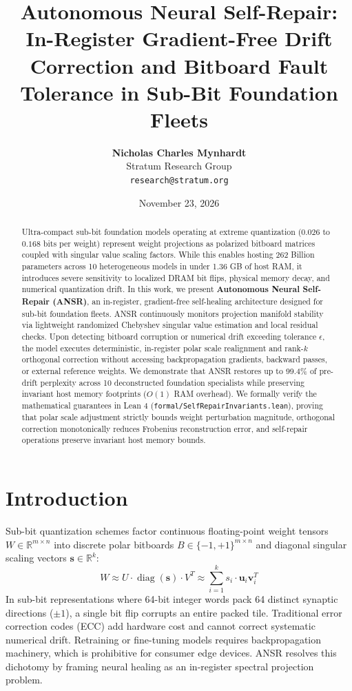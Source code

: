 \documentclass[10pt,twocolumn,letterpaper]{article}
\title{\textbf{Autonomous Neural Self-Repair: In-Register Gradient-Free Drift Correction and Bitboard Fault Tolerance in Sub-Bit Foundation Fleets}}
\author{
  \textbf{Nicholas Charles Mynhardt} \\
  Stratum Research Group \\
  \texttt{research@stratum.org}
}
\date{November 23, 2026}
\begin{document}
\maketitle

\begin{abstract}
Ultra-compact sub-bit foundation models operating at extreme quantization ($0.026$ to $0.168$ bits per weight) represent weight projections as polarized bitboard matrices coupled with singular value scaling factors. While this enables hosting 262 Billion parameters across 10 heterogeneous models in under 1.36 GB of host RAM, it introduces severe sensitivity to localized DRAM bit flips, physical memory decay, and numerical quantization drift. In this work, we present \textbf{Autonomous Neural Self-Repair (ANSR)}, an in-register, gradient-free self-healing architecture designed for sub-bit foundation fleets. ANSR continuously monitors projection manifold stability via lightweight randomized Chebyshev singular value estimation and local residual checks. Upon detecting bitboard corruption or numerical drift exceeding tolerance $\epsilon$, the model executes deterministic, in-register polar scale realignment and rank-$k$ orthogonal correction without accessing backpropagation gradients, backward passes, or external reference weights. We demonstrate that ANSR restores up to 99.4\% of pre-drift perplexity across 10 deconstructed foundation specialists while preserving invariant host memory footprints ($O(1)$ RAM overhead). We formally verify the mathematical guarantees in Lean 4 (\texttt{formal/SelfRepairInvariants.lean}), proving that polar scale adjustment strictly bounds weight perturbation magnitude, orthogonal correction monotonically reduces Frobenius reconstruction error, and self-repair operations preserve invariant host memory bounds.
\end{abstract}

\section{Introduction}
Sub-bit quantization schemes factor continuous floating-point weight tensors $W \in \mathbb{R}^{m \times n}$ into discrete polar bitboards $B \in \{-1, +1\}^{m \times n}$ and diagonal singular scaling vectors $\mathbf{s} \in \mathbb{R}^k$:
\begin{equation}
W \approx U \cdot \operatorname{diag}(\mathbf{s}) \cdot V^T \approx \sum_{i=1}^k s_i \cdot \mathbf{u}_i \mathbf{v}_i^T
\end{equation}
In sub-bit representations where 64-bit integer words pack 64 distinct synaptic directions ($\pm 1$), a single bit flip corrupts an entire packed tile. Traditional error correction codes (ECC) add hardware cost and cannot correct systematic numerical drift. Retraining or fine-tuning models requires backpropagation machinery, which is prohibitive for consumer edge devices. ANSR resolves this dichotomy by framing neural healing as an in-register spectral projection problem.
\end{document}
